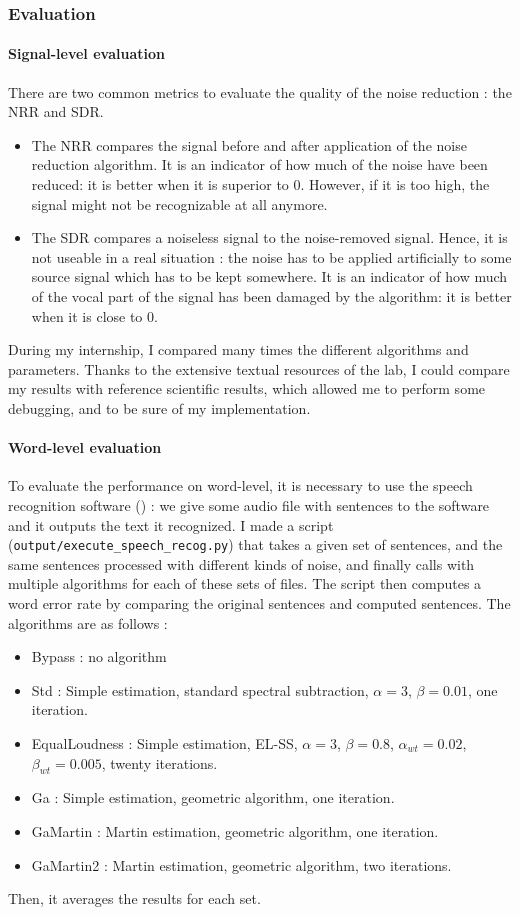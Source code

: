 \subsubsection{Evaluation}
\paragraph{Signal-level evaluation}
There are two common metrics\cite{horii2013musical} to evaluate the quality of the noise reduction : the \ac{NRR} and \ac{SDR}.
\begin{itemize}
\item The \ac{NRR} compares the signal before and after application of the noise reduction algorithm. It is an indicator of how much of the noise have been reduced: it is better when it is superior to $0$. However, if it is too high, the signal might not be recognizable at all anymore.
\item The \ac{SDR} compares a noiseless signal to the noise-removed signal. Hence, it is not useable in a real situation : the noise has to be applied artificially to some source signal which has to be kept somewhere. It is an indicator of how much of the vocal part of the signal has been damaged by the algorithm: it is better when it is close to $0$.
\end{itemize}

During my internship, I compared many times the different algorithms and parameters. Thanks to the extensive textual resources of the lab, I could compare my results with reference scientific results, which allowed me to perform some debugging, and to be sure of my implementation.
\paragraph{Word-level evaluation}
To evaluate the performance on word-level, it is necessary to use the speech recognition software () : we give some audio file with sentences to the software and it outputs the text it recognized. I made a script (\texttt{output/execute\_speech\_recog.py}) that takes a given set of sentences, and the same sentences processed with different kinds of noise, and finally calls  with multiple algorithms for each of these sets of files. The script then computes a word error rate by comparing the original sentences and computed sentences. 
The algorithms are as follows : 
\begin{itemize}
\item Bypass : no algorithm
\item Std : Simple estimation, standard spectral subtraction, $\alpha = 3$, $\beta = 0.01$, one iteration.
\item EqualLoudness : Simple estimation, EL-SS, $\alpha = 3$, $\beta = 0.8$, $\alpha_{wt} = 0.02$, $\beta_{wt} = 0.005$, twenty iterations.
\item Ga : Simple estimation, geometric algorithm, one iteration.
\item GaMartin : Martin estimation, geometric algorithm, one iteration.
\item GaMartin2 : Martin estimation, geometric algorithm, two iterations.
\end{itemize}Then, it averages the results for each set.

